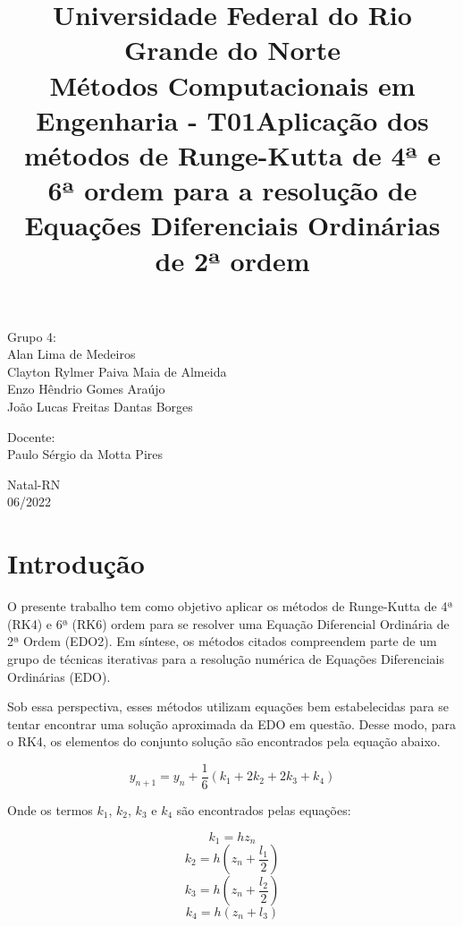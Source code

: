 \documentclass[a4paper,11pt]{article}
\title{Universidade Federal do Rio Grande do Norte\\Métodos Computacionais em Engenharia - T01\linebreak\linebreak\linebreak\linebreak  Aplicação dos métodos de Runge-Kutta de 4ª e 6ª ordem para a resolução de Equações  Diferenciais Ordinárias de 2ª ordem}
\author{}
\date{}
\begin{document}
\maketitle
\thispagestyle{empty}
\vspace{2cm}
\begin{minipage}{\textwidth}
\flushright
{\large
Grupo 4:\\
Alan Lima de Medeiros\\
Clayton Rylmer Paiva Maia de Almeida\\
Enzo Hêndrio Gomes Araújo\\
João Lucas Freitas Dantas Borges\\

\vspace{0.5cm}
\vspace{0.5cm}

Docente:\\
Paulo Sérgio da Motta Pires\\}
\vspace{3.5cm}
\center
{\large
Natal-RN\\06/2022}
\end{minipage} 
\pagebreak

\tableofcontents

\pagebreak

\section{Introdução}
    O presente trabalho tem como objetivo aplicar os métodos de Runge-Kutta de 4ª (RK4) e 6ª (RK6) ordem para se resolver uma Equação Diferencial Ordinária de 2ª Ordem (EDO2). Em síntese, os métodos citados compreendem parte de um grupo de técnicas iterativas para a resolução numérica de Equações Diferenciais Ordinárias (EDO).  
    
    Sob essa perspectiva, esses métodos utilizam equações bem estabelecidas para se tentar encontrar uma solução aproximada da EDO em questão. Desse modo, para o RK4, os elementos do conjunto solução são encontrados pela equação abaixo.
    
    \begin{equation}
        \label{RK4}
        y_{n+1} = y_n + \frac{1}{6}(k_1+2k_2+2k_3+k_4)
    \end{equation}
    
    Onde os termos $k_1$, $k_2$, $k_3$ e $k_4$ são encontrados pelas equações:
    
    \begin{equation}
        \label{K1}
        k_1=hz_n
    \end{equation}
    \begin{equation}
        \label{K2}
        k_2=h\left(z_n+\frac{l_1}{2}\right)
    \end{equation}
    \begin{equation}
        \label{K3}
        k_3=h\left(z_n+\frac{l_2}{2}\right)
    \end{equation}
    \begin{equation}
        \label{K4}
        k_4=h(z_n+l_3)
    \end{equation}
    
\end{document}

